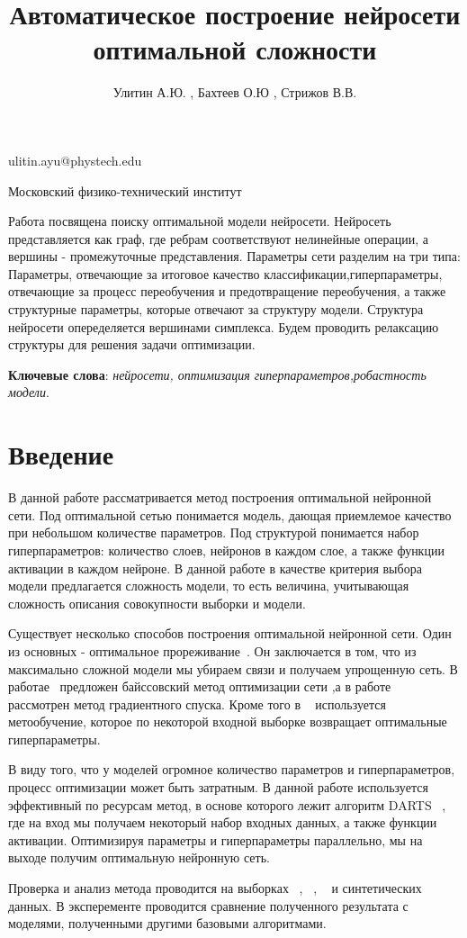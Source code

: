 \documentclass[12pt,twoside]{article}
\begin{document}
\title
    {Автоматическое построение нейросети оптимальной сложности}
\author
    {Улитин А.Ю. , Бахтеев О.Ю , Стрижов В.В.} %
\email
    {ulitin.ayu@phystech.edu}

\organization
    {Московский физико-технический институт}
\abstract
	{Работа посвящена поиску  оптимальной модели нейросети. Нейросеть представляется как граф, где ребрам соответствуют нелинейные операции, а вершины - промежуточные представления. Параметры сети разделим на три типа: Параметры, отвечающие за итоговое качество классификации,гиперпараметры, отвечающие за процесс переобучения и предотвращение переобучения, а также структурные параметры, которые отвечают за структуру  модели. Структура нейросети опеределяется вершинами симплекса. Будем проводить релаксацию структуры для решения задачи оптимизации. 


\bigskip
\textbf{Ключевые слова}: \emph {нейросети, оптимизация гиперпараметров,робастность модели}.

}

\maketitle

\section{Введение}
В данной работе рассматривается метод построения оптимальной нейронной сети. Под оптимальной сетью понимается модель, дающая приемлемое качество при небольшом количестве параметров. Под структурой понимается набор гиперпараметров: количество слоев, нейронов в каждом слое, а также функции активации в каждом нейроне. В данной работе в качестве критерия выбора модели предлагается сложность модели, то есть величина, учитывающая сложность описания совокупности выборки и модели.

\par Существует несколько способов построения оптимальной нейронной сети. Один из основных - оптимальное прореживание~\cite{BrainDamage}. Он заключается в том, что из максимально сложной модели мы убираем связи и получаем упрощенную сеть. В работае~\cite{BayesOptim}  предложен байссовский метод оптимизации сети ,а в работе  ~\cite{GradientOptim} рассмотрен метод градиентного спуска. Кроме того в ~\cite{Met} используется метообучение, которое по некоторой входной выборке возвращает оптимальные гиперпараметры.
\par В виду того, что у моделей огромное количество параметров и гиперпараметров, процесс оптимизации может быть затратным. В данной работе используется эффективный по ресурсам метод, в основе которого лежит алгоритм DARTS ~\cite{DARTS}, где на вход мы получаем некоторый набор входных данных, а также функции активации. Оптимизируя параметры и гиперпараметры параллельно, мы на выходе получим оптимальную нейронную сеть.
\par Проверка и анализ метода проводится на выборках ~\cite{Boston},~\cite{MNIST} , ~\cite{CIFAR-10} и синтетических данных. В эксперементе проводится сравнение полученного результата с моделями, полученными другими базовыми алгоритмами.
\end{document}
